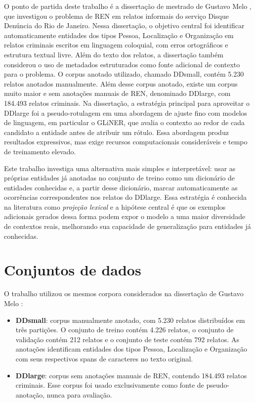 \documentclass[12pt,a4paper]{article}
\begin{document}
O ponto de partida deste trabalho é a dissertação de mestrado de Gustavo Melo
\citep{melo2026ren}, que investigou o problema de REN em relatos informais do
serviço Disque Denúncia do Rio de Janeiro. Nessa dissertação, o objetivo central
foi identificar automaticamente entidades dos tipos Pessoa, Localização e
Organização em relatos criminais escritos em linguagem coloquial, com erros
ortográficos e estrutura textual livre. Além do texto dos relatos, a dissertação
também considerou o uso de metadados estruturados como fonte adicional de
contexto para o problema. O corpus anotado utilizado, chamado DDsmall, contém
5.230 relatos anotados manualmente.
Além desse corpus anotado, existe um corpus muito maior e sem anotações
manuais de REN, denominado DDlarge, com 184.493 relatos criminais. Na
dissertação, a estratégia principal para aproveitar o DDlarge foi a
pseudo-rotulagem em uma abordagem de ajuste fino com modelos de linguagem,
em particular o GLiNER, que avalia o contexto ao redor de cada
candidato a entidade antes de atribuir um rótulo. Essa abordagem produz
resultados expressivos, mas exige recursos computacionais consideráveis e
tempo de treinamento elevado.

Este trabalho investiga uma alternativa mais simples e interpretável: usar as
próprias entidades já anotadas no conjunto de treino como um dicionário de
entidades conhecidas e, a partir desse dicionário, marcar automaticamente as
ocorrências correspondentes nos relatos do DDlarge. Essa estratégia é conhecida
na literatura como \emph{projeção lexical} e a hipótese central é que os exemplos
adicionais gerados dessa forma podem expor o modelo a uma maior diversidade de
contextos reais, melhorando sua capacidade de generalização para entidades já
conhecidas.

\section{Conjuntos de dados}

O trabalho utilizou os mesmos corpora considerados na dissertação de Gustavo Melo
\citep{melo2026ren}:

\begin{itemize}
  \item \textbf{DDsmall}: corpus manualmente anotado, com 5.230 relatos distribuídos
    em três partições. O conjunto de treino contém 4.226 relatos, o conjunto de
    validação contém 212 relatos e o conjunto de teste contém 792 relatos. As
    anotações identificam entidades dos tipos Pessoa, Localização e Organização
    com seus respectivos spans de caracteres no texto original.
  \item \textbf{DDlarge}: corpus sem anotações manuais de REN, contendo 184.493
    relatos criminais. Esse corpus foi usado exclusivamente como fonte de
    pseudo-anotação, nunca para avaliação.
\end{itemize}
\end{document}
